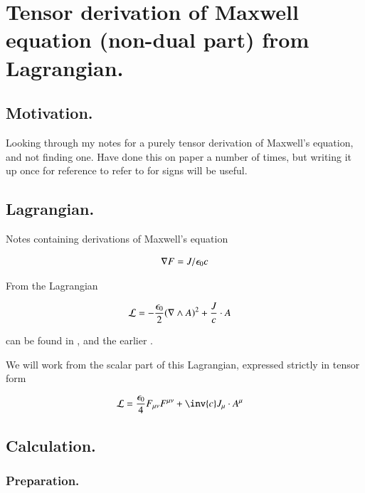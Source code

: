 \chapter{Tensor derivation of Maxwell equation (non-dual part) from Lagrangian. }
\label{chap:maxwellTensorFromLagrangian}
\date{ April 20, 2009.  $RCSfile: maxwellTensorFromLagrangian.tex,v $ Last $Revision: 1.7 $ $Date: 2009/10/22 02:07:20 $ }

\section{Motivation. }

Looking through my notes for a purely tensor derivation of Maxwell's equation, and not finding one.  Have done this on
paper a number of times, but writing it up once for reference to refer to for signs will be useful.

\section{Lagrangian. }

Notes containing derivations of Maxwell's equation

\begin{align}\label{eqn:maxTenLag:maxwell}
\nabla F = J/\epsilon_0 c
\end{align}

From the Lagrangian

\begin{align}\label{eqn:maxTenLag:maxlag}
\mathcal{L} &= -\frac{\epsilon_0}{2} (\nabla \wedge A)^2 + \frac{J}{c} \cdot A
\end{align}

can be found in , and the earlier .

We will work from the scalar part of this Lagrangian, expressed strictly in tensor form

\begin{align}
\LL &= \frac{\epsilon_0}{4} F_{\mu\nu}F^{\mu\nu} + \inv{c} J_\mu \cdot A^\mu
\end{align}

\section{Calculation. }

\subsection{Preparation. }


